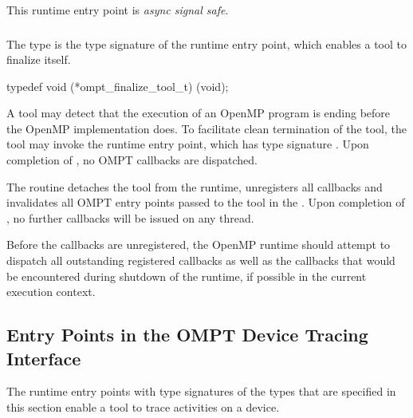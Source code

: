 This runtime entry point is \emph{async signal safe}.



\subsubsection{}
\label{sec:ompt_finalize_tool_t}
\label{sec:ompt_finalize_tool}

\summary
The  type is the type signature of the 
 runtime entry point, which enables a tool 
to finalize itself.

\format
\begin{ccppspecific}
\begin{omptInquiry}
typedef void (*ompt_finalize_tool_t) (void);
\end{omptInquiry}
\end{ccppspecific}

\descr
A tool may detect that the execution of an OpenMP program is ending 
before the OpenMP implementation does. To facilitate clean termination 
of the tool, the tool may invoke the  runtime 
entry point, which has type signature . Upon 
completion of , no OMPT callbacks are dispatched.

\effect
The  routine detaches the tool from the runtime, 
unregisters all callbacks and invalidates all OMPT entry points passed to 
the tool in the . Upon completion of ,
no further callbacks will be issued on any thread.

Before the callbacks are unregistered, the OpenMP runtime should attempt
to dispatch all outstanding registered callbacks as well as the callbacks 
that would be encountered during shutdown of the runtime, if possible in 
the current execution context.



\subsection{Entry Points in the OMPT Device Tracing Interface}
\label{sec:ompt-tracing-entry-points}

The runtime entry points with type signatures of the types that are 
specified in this section enable a tool to trace activities on a device.



\subsubsection{}
\label{sec:ompt_get_device_num_procs_t}

